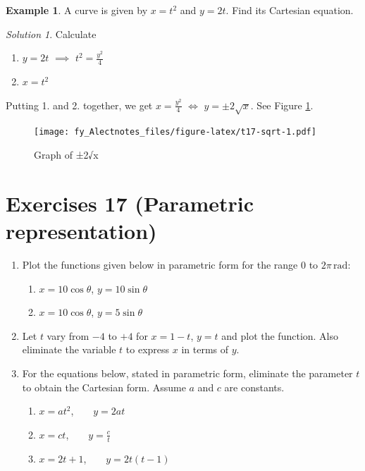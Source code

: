 \documentclass[
  12pt,
  oneside]{book}
\providecommand{\tightlist}{%
  \setlength{\itemsep}{0pt}\setlength{\parskip}{0pt}}
\theoremstyle{definition}
\theoremstyle{definition}
\newtheorem{example}{Example}[chapter]
\theoremstyle{definition}
\theoremstyle{definition}
\theoremstyle{remark}
\newtheorem*{solution}{Solution}
\begin{document}
\begin{example}
A curve is given by \(x=t^2\) and \(y=2t\). Find its Cartesian equation.
\end{example}

\begin{solution}
Calculate

\begin{enumerate}
\def\labelenumi{\arabic{enumi}.}
\tightlist
\item
  \(y=2t\) \(\implies\) \(t^2=\frac{y^2}{4}\)\\
\item
  \(x=t^2\)
\end{enumerate}

Putting 1. and 2. together, we get \(x=\frac{y^2}{4}\) \(\iff\) \(y=\pm2\sqrt{x}\). See Figure \ref{fig:t17-sqrt}.
\end{solution}

\begin{figure}
\centering
\texttt{[image: fy\_Alectnotes\_files/figure-latex/t17-sqrt-1.pdf]}
\caption{\label{fig:t17-sqrt}Graph of ±2√x}
\end{figure}

\hypertarget{exercises-17-parametric-representation}{%
\chapter*{Exercises 17 (Parametric representation)}\label{exercises-17-parametric-representation}}

\begin{enumerate}
\def\labelenumi{\arabic{enumi}.}
\item
  Plot the functions given below in parametric form for the range \(0\) to \(2\pi\,\mathrm{rad}\):

  \begin{enumerate}
  \def\labelenumii{\roman{enumii})}
  \tightlist
  \item
    \(x = 10\cos\theta\), \(y = 10\sin\theta\)
  \item
    \(x = 10\cos\theta\), \(y = 5\sin\theta\)
  \end{enumerate}
\item
  Let \(t\) vary from \(-4\) to \(+4\) for \(x = 1 - t\), \(y = t\) and plot the function. Also eliminate the variable \(t\) to express \(x\) in terms of \(y\).
\item
  For the equations below, stated in parametric form, eliminate the parameter \(t\) to obtain the Cartesian form. Assume \(a\) and \(c\) are constants.

  \begin{enumerate}
  \def\labelenumii{\roman{enumii})}
  \tightlist
  \item
    \(x = at^2\), ~ ~ \(y = 2at\)
  \item
    \(x = ct\), ~ ~ \(y=\frac{c}{t}\)
  \item
    \(x = 2t + 1\), ~ ~ \(y = 2t(t - 1)\)
  \end{enumerate}
\end{enumerate}
\end{document}
